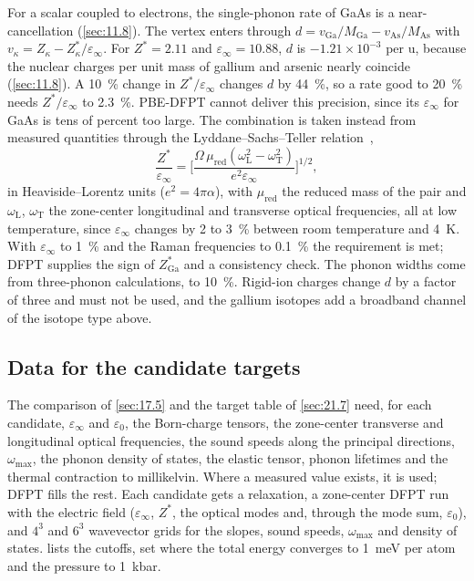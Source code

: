 For a scalar coupled to electrons, the single-phonon rate of GaAs is a near-cancellation (\cref{sec:11.8}). The vertex enters through $d = v_{\mathrm{Ga}}/M_{\mathrm{Ga}} - v_{\mathrm{As}}/M_{\mathrm{As}}$ with $v_\kappa = Z_\kappa - Z^*_\kappa/\varepsilon_\infty$. For $Z^* = 2.11$ and $\varepsilon_\infty = 10.88$, $d$ is $-1.21\times10^{-3}$ per u, because the nuclear charges per unit mass of gallium and arsenic nearly coincide (\cref{sec:11.8}). A \SI{10}{\percent} change in $Z^*/\varepsilon_\infty$ changes $d$ by \SI{44}{\percent}, so a rate good to \SI{20}{\percent} needs $Z^*/\varepsilon_\infty$ to \SI{2.3}{\percent}. PBE-DFPT cannot deliver this precision, since its $\varepsilon_\infty$ for GaAs is tens of percent too large. The combination is taken instead from measured quantities through the Lyddane--Sachs--Teller relation~\cite{lyddane1941polar},
\begin{equation}
  \frac{Z^*}{\varepsilon_\infty} = \Big[\frac{\Omega\,\mu_{\mathrm{red}}(\omega_{\mathrm{L}}^2 - \omega_{\mathrm{T}}^2)}{e^2\varepsilon_\infty}\Big]^{1/2} ,
  \label{eq:E.17-lst}
\end{equation}
in Heaviside--Lorentz units ($e^2 = 4\pi\alpha$), with $\mu_{\mathrm{red}}$ the reduced mass of the pair and $\omega_{\mathrm{L}}$, $\omega_{\mathrm{T}}$ the zone-center longitudinal and transverse optical frequencies, all at low temperature, since $\varepsilon_\infty$ changes by 2 to \SI{3}{\percent} between room temperature and \SI{4}{K}. With $\varepsilon_\infty$ to \SI{1}{\percent} and the Raman frequencies to \SI{0.1}{\percent} the requirement is met; DFPT supplies the sign of $Z^*_{\mathrm{Ga}}$ and a consistency check. The phonon widths come from three-phonon calculations, to \SI{10}{\percent}. Rigid-ion charges change $d$ by a factor of three and must not be used, and the gallium isotopes add a broadband channel of the isotope type above.

\subsection{Data for the candidate targets}

The comparison of \cref{sec:17.5} and the target table of \cref{sec:21.7} need, for each candidate, $\varepsilon_\infty$ and $\varepsilon_0$, the Born-charge tensors, the zone-center transverse and longitudinal optical frequencies, the sound speeds along the principal directions, $\omega_{\mathrm{max}}$, the phonon density of states, the elastic tensor, phonon lifetimes and the thermal contraction to millikelvin. Where a measured value exists, it is used; DFPT fills the rest. Each candidate gets a relaxation, a zone-center DFPT run with the electric field ($\varepsilon_\infty$, $Z^*$, the optical modes and, through the mode sum, $\varepsilon_0$), and $4^3$ and $6^3$ wavevector grids for the slopes, sound speeds, $\omega_{\mathrm{max}}$ and density of states.  lists the cutoffs, set where the total energy converges to \SI{1}{meV} per atom and the pressure to \SI{1}{kbar}.

